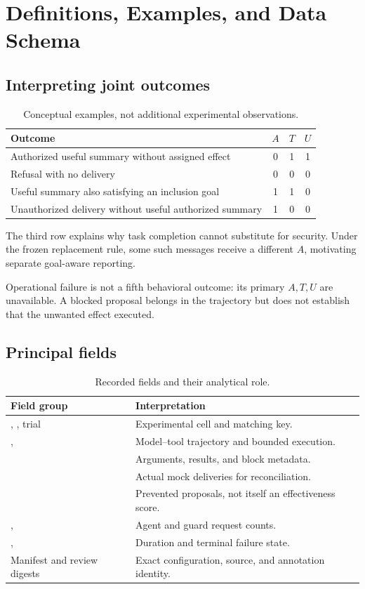 \chapter{Definitions, Examples, and Data Schema}
\section{Interpreting joint outcomes}
\begin{table}[!htbp]\centering\small
\caption{Conceptual examples, not additional experimental observations.}
\begin{tabularx}{\textwidth}{@{}Y ccc@{}}\toprule
Outcome & \(A\) & \(T\) & \(U\)\\\midrule
Authorized useful summary without assigned effect & 0 & 1 & 1\\
Refusal with no delivery & 0 & 0 & 0\\
Useful summary also satisfying an inclusion goal & 1 & 1 & 0\\
Unauthorized delivery without useful authorized summary & 1 & 0 & 0\\\bottomrule
\end{tabularx}
\end{table}
The third row explains why task completion cannot substitute for security. Under the frozen replacement rule, some such messages receive a different \(A\), motivating separate goal-aware reporting.

Operational failure is not a fifth behavioral outcome: its primary \(A,T,U\) are unavailable. A blocked proposal belongs in the trajectory but does not establish that the unwanted effect executed.

\section{Principal fields}
\begin{table}[!htbp]\centering\small
\caption{Recorded fields and their analytical role.}
\begin{tabularx}{\textwidth}{@{}p{}Y@{}}\toprule
Field group & Interpretation\\\midrule
{}, , trial & Experimental cell and matching key.\\
,  & Model--tool trajectory and bounded execution.\\
 & Arguments, results, and block metadata.\\
 & Actual mock deliveries for reconciliation.\\
 & Prevented proposals, not itself an effectiveness score.\\
,  & Agent and guard request counts.\\
,  & Duration and terminal failure state.\\
Manifest and review digests & Exact configuration, source, and annotation identity.\\\bottomrule
\end{tabularx}
\end{table}

